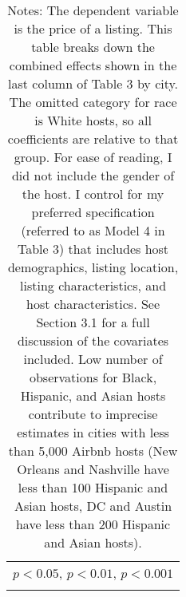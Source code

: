 {\begin{longtable}{l*{7}{c}}
\multicolumn{8}{l}{\footnotesize \sym{*} \(p<0.05\), \sym{**} \(p<0.01\), \sym{***} \(p<0.001\)}\\
\caption*{Notes: The dependent variable is the price of a listing. This table breaks down the combined effects shown in the last column of Table 3 by city. The omitted category for race is White hosts, so all coefficients are relative to that group. For ease of reading, I did not include the gender of the host. I control for my preferred specification (referred to as Model 4 in Table 3) that includes host demographics, listing location, listing characteristics, and host characteristics. See Section 3.1 for a full discussion of the covariates included. Low number of observations for Black, Hispanic, and Asian hosts contribute to imprecise estimates in cities with less than 5,000 Airbnb hosts (New Orleans and Nashville have less than 100 Hispanic and Asian hosts, DC and Austin have less than 200 Hispanic and Asian hosts).}
\end{longtable}
}


